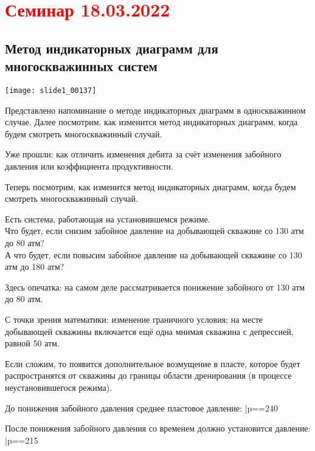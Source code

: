\documentclass[main.tex]{subfiles}
\begin{document}
\section{\textcolor{red}{Семинар 18.03.2022}}

\subsection{Метод индикаторных диаграмм для многоскважинных систем}

\texttt{[image: slide1\_00137]}

Представлено напоминание о методе индикаторных диаграмм в односкважинном случае. Далее посмотрим, как изменится метод индикаторных диаграмм, когда будем смотреть многоскважинный случай.

Уже прошли: как отличить изменения дебита за счёт изменения забойного давления или коэффициента продуктивности.

Теперь посмотрим, как изменится метод индикаторных диаграмм, когда будем смотреть многоскважинный случай.


Есть система, работающая на установившемся режиме.\\

Что будет, если снизим забойное давление на добывающей скважине со 130 атм до 80 атм?\\

А что будет, если повысим забойное давление на добывающей скважине со 130 атм до 180 атм?\\


Здесь опечатка: на самом деле рассматривается понижение забойного от 130 атм до 80 атм.

С точки зрения математики: изменение граничного условия; на месте добывающей скважины включается ещё одна мнимая скважина с депрессией, равной 50 атм.

Если сложим, то появится дополнительное возмущение в пласте, которое будет распространятся от скважины до границы области дренирования (в процессе неустановившегося режима).

До понижения забойного давления среднее пластовое давление:
\beq
\bar{p}==240
\eeq

После понижения забойного давления со временем должно установится давление:
\beq
\bar{p}==215
\eeq
\end{document}

